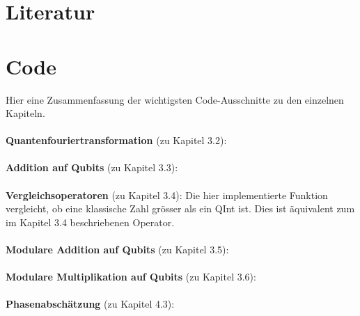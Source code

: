 \section{Literatur}
\printbibliography[heading=none]
\pagebreak
\section{Code}
Hier eine Zusammenfassung der wichtigsten Code-Ausschnitte zu den einzelnen Kapiteln.
\paragraph{}

\textbf{Quantenfouriertransformation} (zu Kapitel 3.2):

\paragraph{}

\textbf{Addition auf Qubits} (zu Kapitel 3.3):

\paragraph{}

\textbf{Vergleichsoperatoren} (zu Kapitel 3.4):
\newline
Die hier implementierte Funktion vergleicht, ob eine klassische Zahl grösser als ein QInt ist. Dies ist äquivalent zum im Kapitel 3.4 beschriebenen Operator.

\paragraph{}

\textbf{Modulare Addition auf Qubits} (zu Kapitel 3.5):

\paragraph{}

\textbf{Modulare Multiplikation auf Qubits} (zu Kapitel 3.6):

\paragraph{}

\textbf{Phasenabschätzung} (zu Kapitel 4.3):

\paragraph{}


